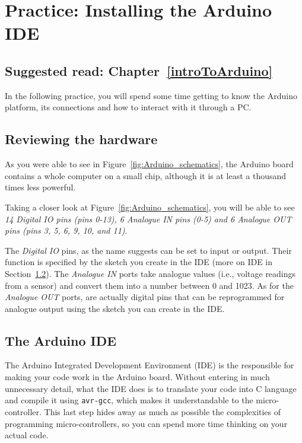 \chapter{Practice: Installing the Arduino IDE}\label{pract:settingTheIDE}
\section*{Suggested read: Chapter~\ref{introToArduino}}

In the following practice, you will spend some time getting to know the Arduino platform, its connections and how to interact with it through a PC.

\section{Reviewing the hardware}\label{pract:settingTheIDE:hardware}
As you were able to see in Figure~\ref{fig:Arduino_schematics}, the Arduino board contains a whole computer on a small chip, although it is at least a thousand times less powerful.

Taking a closer look at Figure~\ref{fig:Arduino_schematics}, you will be able to see \emph{14 Digital IO pins (pins 0-13), 6 Analogue IN pins (0-5) and 6 Analogue OUT pins (pins 3, 5, 6, 9, 10, and 11)}.

The \emph{Digital IO} pins, as the name suggests can be set to input or output. Their function is specified by the sketch you create in the IDE (more on IDE in Section~\ref{pract:settingTheIDE:IDE}). The \emph{Analogue IN} ports take analogue values (i.e., voltage readings from a sensor) and convert them into a number between 0 and 1023. As for the \emph{Analogue OUT} ports, are actually digital pins that can be reprogrammed for analogue output using the sketch you can create in the IDE.

\section{The Arduino IDE}\label{pract:settingTheIDE:IDE}
The Arduino Integrated Development Environment (IDE) is the responsible for making your code work in the Arduino board. Without entering in much unnecessary detail, what the IDE does is to translate your code into C language and compile it using \texttt{avr-gcc}, which makes it understandable to the micro-controller. This last step hides away as much as possible the complexities of programming micro-controllers, so you can spend more time thinking on your actual code.

